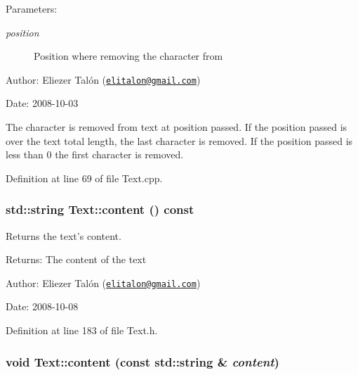 \begin{Desc}
\item[Parameters:]
\begin{description}
\item[{\em position}]Position where removing the character from\end{description}
\end{Desc}
\begin{Desc}
\item[Author:]Eliezer Talón (\href{mailto:elitalon@gmail.com}{\tt elitalon@gmail.com}) \end{Desc}
\begin{Desc}
\item[Date:]2008-10-03\end{Desc}
The character is removed from text at position passed. If the position passed is over the text total length, the last character is removed. If the position passed is less than 0 the first character is removed. 

Definition at line 69 of file Text.cpp.\hypertarget{class_text_58a34fa2cfd0c240a7517132017b6a83}{
\subsubsection[content]{\setlength{\rightskip}{0pt plus 5cm}std::string Text::content () const}}
\label{class_text_58a34fa2cfd0c240a7517132017b6a83}


Returns the text's content. 

\begin{Desc}
\item[Returns:]The content of the text\end{Desc}
\begin{Desc}
\item[Author:]Eliezer Talón (\href{mailto:elitalon@gmail.com}{\tt elitalon@gmail.com}) \end{Desc}
\begin{Desc}
\item[Date:]2008-10-08 \end{Desc}


Definition at line 183 of file Text.h.\hypertarget{class_text_eca454f28010b6b3e7bd0d771b8eaeb2}{
\subsubsection[content]{\setlength{\rightskip}{0pt plus 5cm}void Text::content (const std::string \& {\em content})}}
\label{class_text_eca454f28010b6b3e7bd0d771b8eaeb2}


